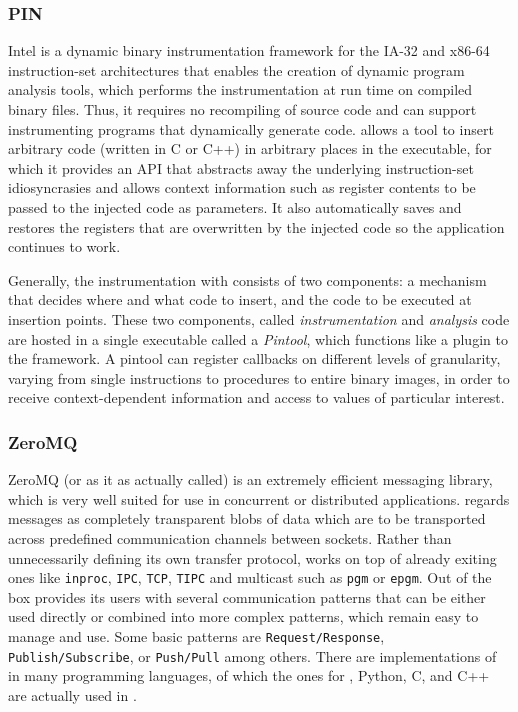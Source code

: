 \subsubsection{PIN}
{\small Intel} \pin\cite{pin} is a dynamic binary instrumentation framework for the IA-32 and x86-64 instruction-set architectures 
that enables the creation of dynamic program analysis tools, which performs the instrumentation at run time on  
compiled binary files. Thus, it requires no recompiling of source code and can support instrumenting programs that dynamically generate code.
\pin allows a tool to insert arbitrary code (written in C or C++) in arbitrary places in the executable, for which it 
provides an API that abstracts away the underlying instruction-set idiosyncrasies and allows context information 
such as register contents to be passed to the injected code as parameters. It also automatically saves and restores 
the registers that are overwritten by the injected code so the application continues to work.

Generally, the instrumentation with \pin consists of two components: a mechanism that decides where and what code to insert, 
and the code to be executed at insertion points. These two components, called \emph{instrumentation} and \emph{analysis} 
code are hosted in a single executable called a \emph{Pintool}, which functions like a plugin to the \pin framework.
A pintool can register callbacks on different levels of granularity, varying from single instructions to procedures
to entire binary images, in order to receive context-dependent information and access to values of particular interest.
\subsubsection{ZeroMQ}
{\small ZeroMQ}\cite{zmq} (or \zmq as it as actually called) is an extremely efficient messaging library, 
which is very well suited for use in concurrent or distributed applications. \zmq regards messages as 
completely transparent blobs of data which are to be transported across predefined communication channels 
between sockets. Rather than unnecessarily defining its own transfer protocol, \zmq works on top of already exiting 
ones like \texttt{inproc}, \texttt{IPC}, \texttt{TCP}, \texttt{TIPC} and multicast such as \texttt{pgm} or \texttt{epgm}.
Out of the box \zmq provides its users with several communication patterns that can be either used directly or combined 
into more complex patterns, which remain easy to manage and use. Some basic patterns are \texttt{Request/Response}, 
\texttt{Publish/Subscribe}, or \texttt{Push/Pull} among others.
There are implementations of \zmq in many programming languages, of which the ones for \java, {\small Python}, {\small C}, 
and {\small C++} are actually used in \xmlmate.
